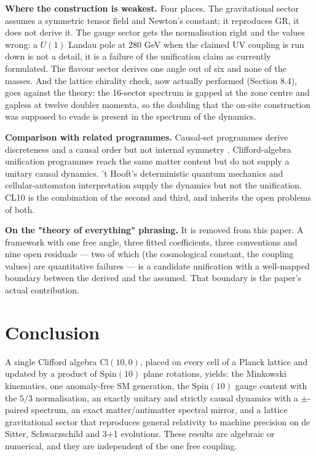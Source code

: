 \documentclass[aps,prd,amsmath,amssymb,superscriptaddress,longbibliography,floatfix,preprint]{revtex4-2}
\begin{document}
\textbf{Where the construction is weakest.} Four places. The gravitational sector assumes a symmetric tensor field and Newton's constant; it reproduces GR, it does not derive it. The gauge sector gets the normalisation right and the values wrong: a $U(1)$ Landau pole at 280 GeV when the claimed UV coupling is run down is not a detail, it is a failure of the unification claim as currently formulated. The flavour sector derives one angle out of six and none of the masses. And the lattice chirality check, now actually performed (Section 8.4), goes against the theory: the 16-sector spectrum is gapped at the zone centre and gapless at twelve doubler momenta, so the doubling that the on-site construction was supposed to evade is present in the spectrum of the dynamics.

\textbf{Comparison with related programmes.} Causal-set programmes derive discreteness and a causal order but not internal symmetry \cite{ref01}. Clifford-algebra unification programmes \cite{ref10,ref11,ref12} reach the same matter content but do not supply a unitary causal dynamics. 't Hooft's deterministic quantum mechanics and cellular-automaton interpretation \cite{ref29,ref30} supply the dynamics but not the unification. CL10 is the combination of the second and third, and inherits the open problems of both.

\textbf{On the "theory of everything" phrasing.} It is removed from this paper. A framework with one free angle, three fitted coefficients, three conventions and nine open residuals --- two of which (the cosmological constant, the coupling values) are quantitative failures --- is a candidate unification with a well-mapped boundary between the derived and the assumed. That boundary is the paper's actual contribution.

\section{Conclusion}

A single Clifford algebra $\mathrm{Cl}(10,\allowbreak{}0)$, placed on every cell of a Planck lattice and updated by a product of $\mathrm{Spin}(10)$ plane rotations, yields: the Minkowski kinematics, one anomaly-free SM generation, the $\mathrm{Spin}(10)$ gauge content with the $5/3$ normalisation, an exactly unitary and strictly causal dynamics with a $\pm$-paired spectrum, an exact matter/antimatter spectral mirror, and a lattice gravitational sector that reproduces general relativity to machine precision on de Sitter, Schwarzschild and 3+1 evolutions. These results are algebraic or numerical, and they are independent of the one free coupling.
\end{document}
